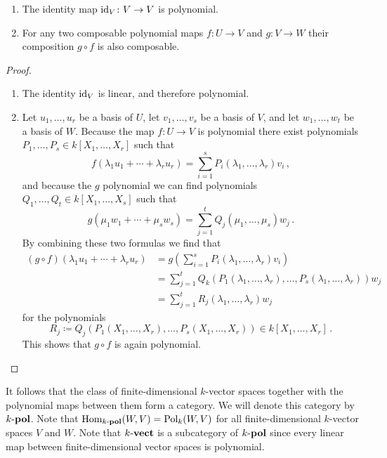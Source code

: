 \begin{lemma}
  \leavevmode
  \begin{enumerate}
    \item
      The identity map $\operatorname{id}_V \colon V \to V$ is polynomial.
    \item
      For any two composable polynomial maps $f \colon U \to V$ and $g \colon V \to W$ their composition $g \circ f$ is also composable.
  \end{enumerate}
\end{lemma}
\begin{proof}
  \leavevmode
  \begin{enumerate}
    \item
      The identity $\operatorname{id}_V$ is linear, and therefore polynomial.
    \item
      Let $u_1, \dotsc, u_r$ be a basis of $U$, let $v_1, \dotsc, v_s$ be a basis of $V$, and let $w_1, \dotsc, w_t$ be a basis of $W$.
      Because the map $f \colon U \to V$ is polynomial there exist polynomials $P_1, \dotsc, P_s \in k[X_1, \dotsc, X_r]$ such that
      \[
          f( \lambda_1 u_1 + \dotsb + \lambda_r u_r )
        = \sum_{i=1}^s P_i(\lambda_1, \dotsc, \lambda_r) v_i \,,
      \]
      and because  the $g$ polynomial we can find polynomials $Q_1, \dotsc, Q_t \in k[X_1, \dotsc, X_s]$ such that
      \[
          g( \mu_1 w_1 + \dotsb + \mu_s w_s )
        = \sum_{j=1}^t Q_j(\mu_1, \dotsc, \mu_s) w_j \,.
      \]
      By combining these two formulas we find that
      \begin{align*}
            (g \circ f)( \lambda_1 u_1 + \dotsb + \lambda_r u_r)
        &=  g
            \left(
              \sum_{i=1}^s P_i(\lambda_1, \dotsc, \lambda_r) v_i
            \right) \\
        &=  \sum_{j=1}^t
              Q_k
              (
              P_1(\lambda_1, \dotsc, \lambda_r),
              \dotsc,
              P_s(\lambda_1, \dotsc, \lambda_r)
              )
              w_j \\
        &=  \sum_{j=1}^t R_j(\lambda_1, \dotsc, \lambda_r) w_j
      \end{align*}
      for the polynomials
      \[
                  R_j
        \coloneqq Q_j(P_1(X_1, \dotsc, X_r), \dotsc, P_s(X_1, \dotsc, X_r))
        \in       k[X_1, \dotsc, X_r] \,.
      \]
      This shows that $g \circ f$ is again polynomial.
  \qedhere
  \end{enumerate}
\end{proof}


\begin{remark}
  It follows that the class of finite-dimensional $k$-vector spaces together with the polynomial maps between them form a category.
  We will denote this category by $k\text{-}\mathbf{pol}$.
  Note that $\operatorname{Hom}_{k\text{-}\mathbf{pol}}(W,V) = \operatorname{Pol}_k(W,V)$ for all finite-dimensional $k$-vector spaces $V$ and $W$.
  Note that $k\text{-}\mathbf{vect}$ is a subcategory of $k\text{-}\mathbf{pol}$ since every linear map between finite-dimensional vector spaces is polynomial.
\end{remark}


